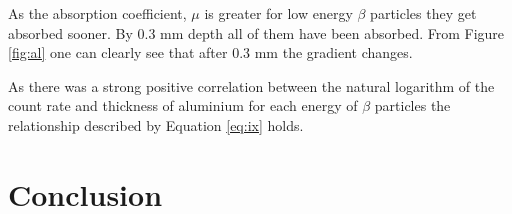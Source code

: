 \documentclass[twocolumn]{revtex4-1}
\begin{document}
As the absorption coefficient, $\mu$ is greater for low energy $\beta$ particles they get absorbed sooner. 
By 0.3 mm depth all of them have been absorbed.
From Figure \ref{fig:al} one can clearly see that after 0.3 mm the gradient changes.

As there was a strong positive correlation between the natural logarithm of the count rate and thickness of aluminium for each energy of $\beta$ particles the relationship described by Equation \ref{eq:ix} holds.

\vspace{-4ex}
\section{Conclusion}
\vspace{-3ex} 
\end{document}
